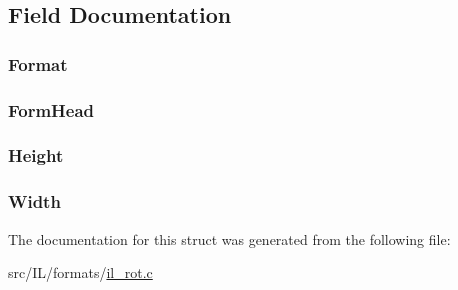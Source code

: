 \subsection{Field Documentation}
\hypertarget{struct_r_o_t___h_e_a_d_a423d6848d970265bc43946f795923316}{
\subsubsection[{Format}]{ Format}}\label{struct_r_o_t___h_e_a_d_a423d6848d970265bc43946f795923316}
\hypertarget{struct_r_o_t___h_e_a_d_a90e6ff076ed506706ec0785ffc17f6b1}{
\subsubsection[{Form\-Head}]{ Form\-Head}}\label{struct_r_o_t___h_e_a_d_a90e6ff076ed506706ec0785ffc17f6b1}
\hypertarget{struct_r_o_t___h_e_a_d_a8a8093d76b61a95fc96df24af29b107a}{
\subsubsection[{Height}]{ Height}}\label{struct_r_o_t___h_e_a_d_a8a8093d76b61a95fc96df24af29b107a}
\hypertarget{struct_r_o_t___h_e_a_d_a4146e7b2b0b4097e0e335f9b348392bf}{
\subsubsection[{Width}]{ Width}}\label{struct_r_o_t___h_e_a_d_a4146e7b2b0b4097e0e335f9b348392bf}


The documentation for this struct was generated from the following file\-:\begin{DoxyCompactItemize}
\item 
src/\-I\-L/formats/\hyperlink{il__rot_8c}{il\-\_\-rot.\-c}\end{DoxyCompactItemize}
